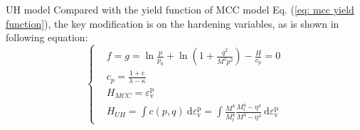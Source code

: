 \documentclass[aspectratio=169]{beamer}
\begin{document}
\begin{frame}{UH model}
    Compared with the yield function of MCC model Eq. (\ref{eq: mcc yield function}), the key modification is on the hardening variables, as is shown in following equation:
    \begin{equation}
        \left\{\begin{aligned}
            &f=g=\ln \frac{p}{p_{0}}+\ln \left(1+\frac{q^{2}}{M^{2} p^{2}}\right)-\frac{H}{c_{\mathrm{p}}}=0 \\
            &c_p = \frac{1+e}{\lambda - \kappa}\\
            &H_{MCC}=\varepsilon_{\mathrm{v}}^{\mathrm{p}}\\
            &H_{UH} = \int c(p, q) \mathrm{~d} \varepsilon_{\mathrm{v}}^{\mathrm{p}} = \int \frac{M^{4}}{M_{\mathrm{f}}^{4}} \frac{M_{\mathrm{f}}^{4}-\eta^{4}}{M^{4}-\eta^{4}} \mathrm{~d} \varepsilon_{\mathrm{v}}^{\mathrm{p}}
        \end{aligned}\right.
        \label{eq: yield function in UH model}
    \end{equation}
\end{frame}
\end{document}
